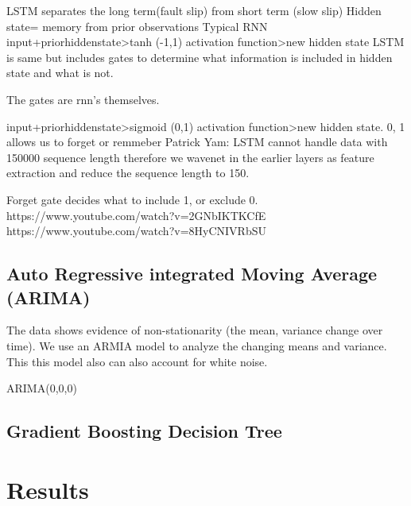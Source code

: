 \documentclass[]{llncs}
\begin{document}
LSTM separates the long term(fault slip) from short term (slow slip)
Hidden state= memory from prior observations
Typical RNN input+priorhiddenstate>tanh (-1,1) activation function>new hidden state
LSTM is same but includes gates to determine what information is included in hidden state and what is not.

The gates are rnn's themselves.

input+priorhiddenstate>sigmoid (0,1) activation function>new hidden state. 0, 1 allows us to forget or remmeber 
Patrick Yam: LSTM cannot handle data with 150000 sequence length therefore we wavenet in the earlier layers as feature extraction and reduce the sequence length to 150.\par

Forget gate decides what to include 1, or exclude 0. 
https://www.youtube.com/watch?v=2GNbIKTKCfE
https://www.youtube.com/watch?v=8HyCNIVRbSU

\subsection{Auto Regressive integrated Moving Average (ARIMA)}
The data shows evidence of non-stationarity (the mean, variance change over time). We use an ARMIA model to analyze the changing means and variance. This this model also can also account for white noise.\par ARIMA(0,0,0)

\subsection{Gradient Boosting Decision Tree}


\section{Results}



\end{document}
